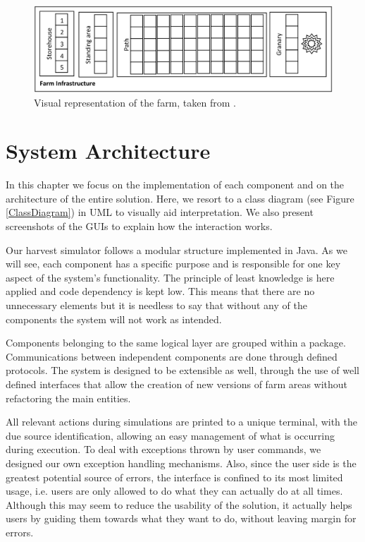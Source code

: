 \documentclass[12pt]{article}
\begin{document}
\begin{figure}[H]
  \centering
  \begin{minipage}{\textwidth}
    \centering
    \includegraphics[width=\linewidth]{img/Design_FI.png}
  \end{minipage}%
  \caption{Visual representation of the farm, taken from \cite{assign}.}
  \label{Design_FI}
\end{figure} 

\newpage
\section{System Architecture} %

In this chapter we focus on the implementation of each component and on the architecture of the entire solution.
Here, we resort to a class diagram (see Figure \ref{ClassDiagram}) in UML \cite{uml} to visually aid interpretation.
We also present screenshots of the GUIs to explain how the interaction works.

Our harvest simulator follows a modular structure implemented in Java.
As we will see, each component has a specific purpose and is responsible for one key aspect of the system's functionality.
The principle of least knowledge is here applied and code dependency is kept low.
This means that there are no unnecessary elements but it is needless to say that without any of the components the system will not work as intended.

Components belonging to the same logical layer are grouped within a package.
Communications between independent components are done through defined protocols. 
The system is designed to be extensible as well, through the use of well defined interfaces that allow the creation of new versions of farm areas without 
refactoring the main entities.

All relevant actions during simulations are printed to a unique terminal, with the due source identification, allowing an easy management of what is occurring 
during execution.
To deal with exceptions thrown by user commands, we designed our own exception handling mechanisms.
Also, since the user side is the greatest potential source of errors, the interface is confined to its most limited usage, i.e. users are only allowed to do 
what they can actually do at all times.
Although this may seem to reduce the usability of the solution, it actually helps users by guiding them towards what they want to do, without leaving margin for errors.
\end{document}
